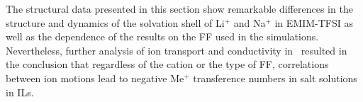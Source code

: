 The structural data presented in this section show remarkable differences in the structure and dynamics of the solvation shell of Li$^{+}$ and Na$^{+}$ in EMIM-TFSI as well as the dependence of the results on the FF used in the simulations. Nevertheless, further analysis of ion transport and conductivity in~\cite{li-na} resulted in the conclusion that regardless of the cation or the type of FF, correlations between ion motions lead to negative Me$^{+}$ transference numbers in salt solutions in ILs.

\cleardoublepage